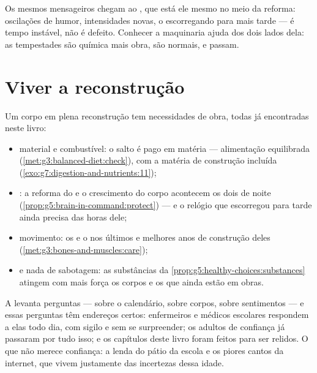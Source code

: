 \begin{remark}\label{rem:g8:puberty:moods}
Os mesmos mensageiros chegam ao , que está ele mesmo no meio da
reforma: oscilações de humor, intensidades novas, o  escorregando
para mais tarde --- é tempo instável, não é defeito. Conhecer a
maquinaria ajuda dos dois lados dela: as tempestades são química mais
obra, são normais, e passam.
\end{remark}

\section{Viver a reconstrução}

\begin{proposition}\label{prop:g8:puberty:care}
Um corpo em plena reconstrução tem necessidades de obra, todas já
encontradas neste livro:
\begin{itemize}
  \item material e combustível: o salto é pago em matéria ---
        alimentação equilibrada
        (\cref{met:g3:balanced-diet:check}), com a matéria de
        construção incluída
        (\cref{exo:g7:digestion-and-nutrients:11});
  \item {}: a reforma do  e o crescimento do corpo
        acontecem os dois de noite
        (\cref{prop:g5:brain-in-command:protect}) --- e o relógio que
        escorregou para tarde ainda precisa das horas dele;
  \item movimento: os  e o  nos últimos e melhores anos
        de construção deles
        (\cref{met:g3:bones-and-muscles:care});
  \item e nada de sabotagem: as substâncias da
        \cref{prop:g5:healthy-choices:substances} atingem com mais
        força os corpos e os  que ainda estão em obras.
\end{itemize}
\end{proposition}
\admitted

\begin{example}\label{ex:g8:puberty:questions}
A  levanta perguntas --- sobre o calendário, sobre corpos,
sobre sentimentos --- e essas perguntas têm endereços certos:
enfermeiros e médicos escolares respondem a elas todo dia, com
sigilo e sem se surpreender; os adultos de confiança já passaram por
tudo isso; e os capítulos deste livro foram feitos para ser relidos. O
que não merece confiança: a lenda do pátio da escola e os piores
cantos da internet, que vivem justamente das incertezas dessa idade.
\end{example}

